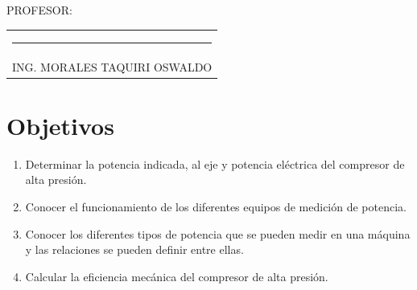\documentclass[a4paper,12pt]{report}
\begin{document}
{\large PROFESOR:} \\[0.6cm]
\begin{center}
\begin{tabular}{c}
\rule[3pt]{4.8in}{1pt}\\[1pt]
ING. MORALES TAQUIRI OSWALDO
\end{tabular}
\end{center}
\vfill
\newpage
\tableofcontents
\newpage
{} %
\setcounter{page}{1}  %
\chapter{Objetivos}
\begin{enumerate}
\item Determinar la potencia indicada, al eje y potencia eléctrica del compresor de alta presión. 
\item Conocer el funcionamiento de los diferentes equipos de medición de potencia.
\item Conocer los diferentes tipos de potencia que se pueden medir en una máquina y las relaciones se pueden definir entre ellas.
\item Calcular la eficiencia mecánica del compresor de alta presión.
\end{enumerate}
\end{document}
